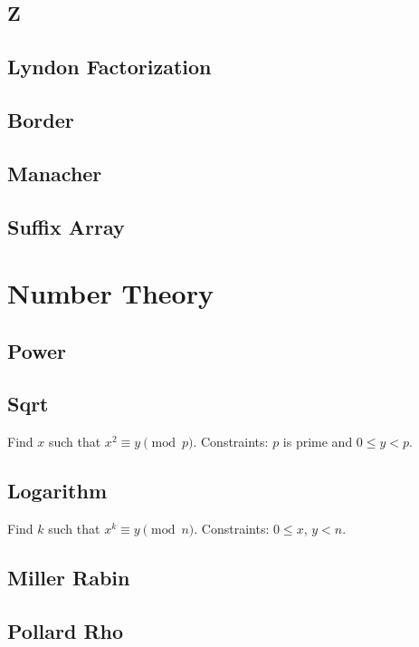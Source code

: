 \documentclass{article}
\begin{document}
\begin{multicols}{2}
    \subsection{Z}
    
    \subsection{Lyndon Factorization}
    
    \subsection{Border}
    
    \subsection{Manacher}
    
    \subsection{Suffix Array}
    

    \section{Number Theory}
    \subsection{Power}
    
    \subsection{Sqrt}
    Find $x$ such that $x^2\equiv y\pmod p$.
    \newline Constraints: $p$ is prime and $0\le y<p$.
    
    \subsection{Logarithm}
    Find $k$ such that $x^k\equiv y\pmod n$.
    \newline Constraints: $0\le x$, $y<n$.
    
    \subsection{Miller Rabin}
    
    \subsection{Pollard Rho}
    

\end{multicols}
\end{document}
